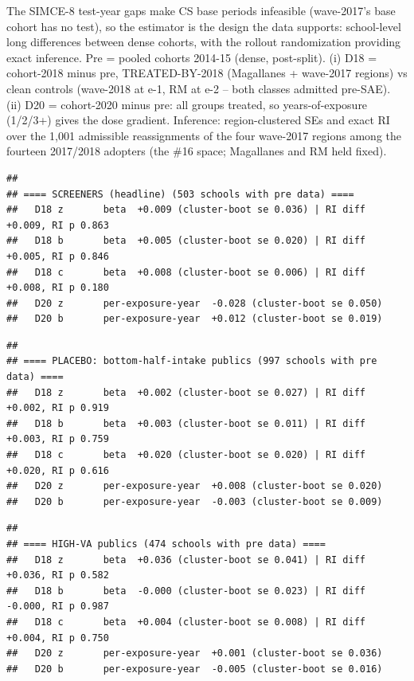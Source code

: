 \documentclass[
]{article}
\begin{document}
The SIMCE-8 test-year gaps make CS base periods infeasible (wave-2017's
base cohort has no test), so the estimator is the design the data
supports: school-level long differences between dense cohorts, with the
rollout randomization providing exact inference. Pre = pooled cohorts
2014-15 (dense, post-split). (i) D18 = cohort-2018 minus pre,
TREATED-BY-2018 (Magallanes + wave-2017 regions) vs clean controls
(wave-2018 at e-1, RM at e-2 -- both classes admitted pre-SAE). (ii) D20
= cohort-2020 minus pre: all groups treated, so years-of-exposure
(1/2/3+) gives the dose gradient. Inference: region-clustered SEs and
exact RI over the 1,001 admissible reassignments of the four wave-2017
regions among the fourteen 2017/2018 adopters (the \#16 space;
Magallanes and RM held fixed).

\begin{verbatim}
## 
## ==== SCREENERS (headline) (503 schools with pre data) ====
##   D18 z       beta  +0.009 (cluster-boot se 0.036) | RI diff  +0.009, RI p 0.863
##   D18 b       beta  +0.005 (cluster-boot se 0.020) | RI diff  +0.005, RI p 0.846
##   D18 c       beta  +0.008 (cluster-boot se 0.006) | RI diff  +0.008, RI p 0.180
##   D20 z       per-exposure-year  -0.028 (cluster-boot se 0.050)
##   D20 b       per-exposure-year  +0.012 (cluster-boot se 0.019)
\end{verbatim}

\begin{verbatim}
## 
## ==== PLACEBO: bottom-half-intake publics (997 schools with pre data) ====
##   D18 z       beta  +0.002 (cluster-boot se 0.027) | RI diff  +0.002, RI p 0.919
##   D18 b       beta  +0.003 (cluster-boot se 0.011) | RI diff  +0.003, RI p 0.759
##   D18 c       beta  +0.020 (cluster-boot se 0.020) | RI diff  +0.020, RI p 0.616
##   D20 z       per-exposure-year  +0.008 (cluster-boot se 0.020)
##   D20 b       per-exposure-year  -0.003 (cluster-boot se 0.009)
\end{verbatim}

\begin{verbatim}
## 
## ==== HIGH-VA publics (474 schools with pre data) ====
##   D18 z       beta  +0.036 (cluster-boot se 0.041) | RI diff  +0.036, RI p 0.582
##   D18 b       beta  -0.000 (cluster-boot se 0.023) | RI diff  -0.000, RI p 0.987
##   D18 c       beta  +0.004 (cluster-boot se 0.008) | RI diff  +0.004, RI p 0.750
##   D20 z       per-exposure-year  +0.001 (cluster-boot se 0.036)
##   D20 b       per-exposure-year  -0.005 (cluster-boot se 0.016)
\end{verbatim}
\end{document}
